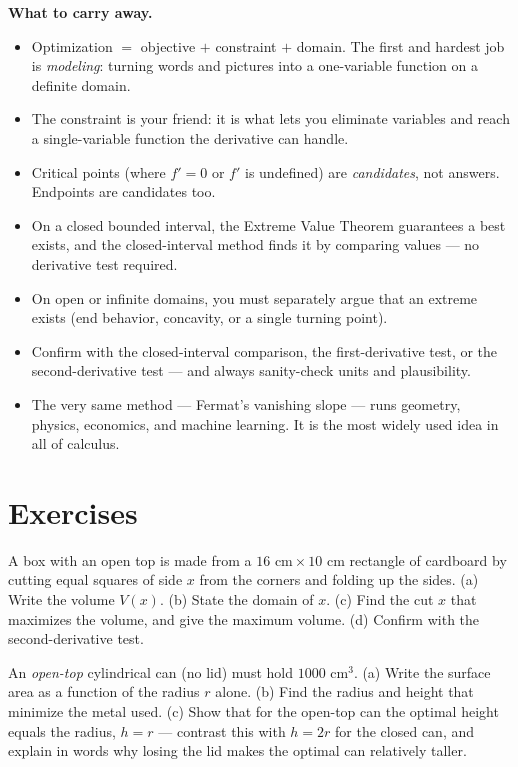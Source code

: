 \begin{focusbox}
\textbf{What to carry away.}
\begin{itemize}
  \item Optimization $=$ objective $+$ constraint $+$ domain. The first and hardest
    job is \emph{modeling}: turning words and pictures into a one-variable function
    on a definite domain.
  \item The constraint is your friend: it is what lets you eliminate variables and
    reach a single-variable function the derivative can handle.
  \item Critical points (where $f'=0$ or $f'$ is undefined) are \emph{candidates},
    not answers. Endpoints are candidates too.
  \item On a closed bounded interval, the Extreme Value Theorem guarantees a best
    exists, and the closed-interval method finds it by comparing values --- no
    derivative test required.
  \item On open or infinite domains, you must separately argue that an extreme exists
    (end behavior, concavity, or a single turning point).
  \item Confirm with the closed-interval comparison, the first-derivative test, or
    the second-derivative test --- and always sanity-check units and plausibility.
  \item The very same method --- Fermat's vanishing slope --- runs geometry, physics,
    economics, and machine learning. It is the most widely used idea in all of
    calculus.
\end{itemize}
\end{focusbox}

\section{Exercises}

\begin{exercise}
A box with an open top is made from a $16\text{ cm}\times 10\text{ cm}$ rectangle of
cardboard by cutting equal squares of side $x$ from the corners and folding up the
sides. (a) Write the volume $V(x)$. (b) State the domain of $x$. (c) Find the cut $x$
that maximizes the volume, and give the maximum volume. (d) Confirm with the
second-derivative test.
\end{exercise}

\begin{exercise}
An \emph{open-top} cylindrical can (no lid) must hold $1000\text{ cm}^3$. (a) Write
the surface area as a function of the radius $r$ alone. (b) Find the radius and height
that minimize the metal used. (c) Show that for the open-top can the optimal height
equals the radius, $h=r$ --- contrast this with $h=2r$ for the closed can, and explain
in words why losing the lid makes the optimal can relatively taller.
\end{exercise}

